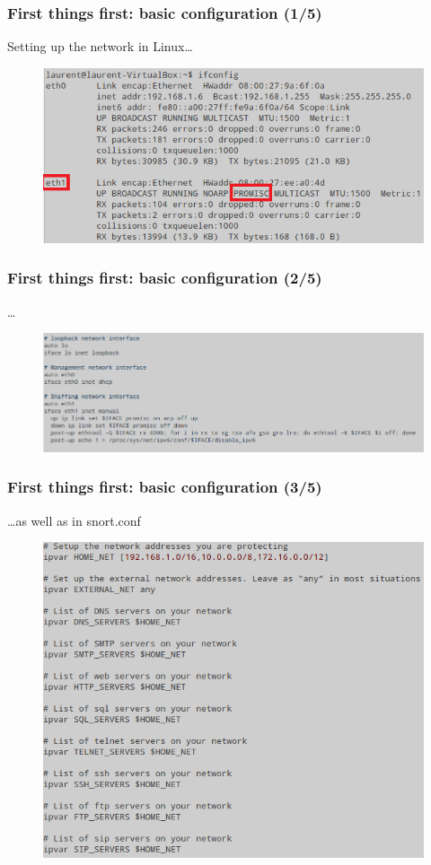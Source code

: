 \documentclass{beamer}
\begin{document}
\begin{frame}
\frametitle{First things first: basic configuration (1/5)}
Setting up the network in Linux\ldots
\begin{figure}
   \includegraphics[width= 1\linewidth]{../images/VM_network.png}
\end{figure}
\end{frame}
\begin{frame}
\frametitle{First things first: basic configuration (2/5)}
\ldots
\begin{figure}
   \includegraphics[width= 1\linewidth]{../images/VM_network_3.png}
\end{figure}
\end{frame}
\begin{frame}
\frametitle{First things first: basic configuration (3/5)}
\ldots as well as in snort.conf
\begin{figure}
   \includegraphics[width= 0.7\linewidth]{../images/VM_network_2.png}
\end{figure}
\end{frame}
\end{document}
